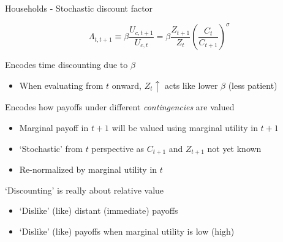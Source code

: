 

\begin{frame}{Households - Stochastic discount factor}

\[
\Lambda_{t,t+1} \equiv \beta \frac{U_{c,t+1}}{U_{c,t}} = \beta \frac{Z_{t+1}}{Z_{t}} \left( \frac{C_{t}}{C_{t+1}} \right)^\sigma
\]

Encodes time discounting due to $\beta$
	\begin{itemize}
	\item	When evaluating from $t$ onward, $Z_{t}\uparrow$ acts like lower $\beta$ (less patient)
	\end{itemize}
\vspace{2mm}
Encodes how payoffs under different \emph{contingencies} are valued
	\begin{itemize}
	\item	Marginal payoff in $t+1$ will be valued using marginal utility in $t+1$
	\item	`Stochastic' from $t$ perspective as $C_{t+1}$ and $Z_{t+1}$ not yet known
	\item	Re-normalized by marginal utility in $t$
	\end{itemize}
\vspace{2mm}
`Discounting' is really about relative value
	\begin{itemize}
	\item 	`Dislike' (like) distant (immediate) payoffs
	\item	`Dislike' (like) payoffs when marginal utility is low (high)
	\end{itemize}

\end{frame}




